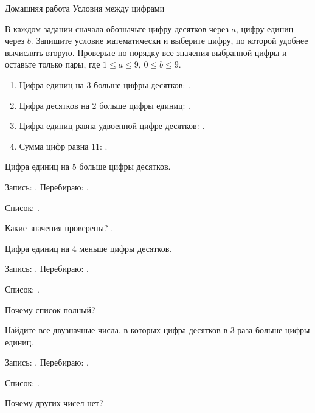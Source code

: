\worksheettitle
  {Домашняя работа}
  { Условия между цифрами}

\studentnameblock

\begin{notebox}[Маршрут]
  В каждом задании сначала обозначьте цифру десятков через \(a\), цифру
  единиц через \(b\). Запишите условие математически и выберите цифру, по
  которой удобнее вычислять вторую. Проверьте по порядку все значения
  выбранной цифры и оставьте только пары, где
  \(1\leq a\leq9\), \(0\leq b\leq9\).
\end{notebox}

\begin{practicebox}
  \begin{enumerate}[label=\textbf{\arabic*.}]
    \item Цифра единиц на \(3\) больше цифры десятков:
      \answerblank[38mm].
    \item Цифра десятков на \(2\) больше цифры единиц:
      \answerblank[38mm].
    \item Цифра единиц равна удвоенной цифре десятков:
      \answerblank[38mm].
    \item Сумма цифр равна \(11\): \answerblank[38mm].
  \end{enumerate}
\end{practicebox}

\begin{practicebox}
  Цифра единиц на \(5\) больше цифры десятков.

  Запись: \answerblank[32mm]. Перебираю: \answerblank[18mm].

  Список: \answerblank[100mm].

  Какие значения проверены? \answerblank[65mm].
\end{practicebox}

\begin{practicebox}
  Цифра единиц на \(4\) меньше цифры десятков.

  Запись: \answerblank[32mm]. Перебираю: \answerblank[18mm].

  Список: \answerblank[100mm].

  Почему список полный? 
\end{practicebox}

\newpage
\begin{practicebox}
  Найдите все двузначные числа, в которых цифра десятков в \(3\) раза больше
  цифры единиц.

  Запись: \answerblank[32mm]. Перебираю: \answerblank[18mm].

  Список: \answerblank[100mm].

  Почему других чисел нет? 
\end{practicebox}

